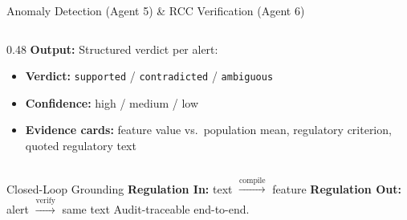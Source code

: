 \documentclass[10pt, aspectratio=169]{beamer}
\newcommand{\hlg}[1]{\textcolor{accentgreen}{#1}}
\newcommand{\hlo}[1]{\textcolor{accentorange}{#1}}
\newcommand{\hlr}[1]{\textcolor{accentred}{#1}}
\begin{document}
\begin{frame}{Anomaly Detection (Agent 5) \& RCC Verification (Agent 6)}
\begin{columns}[T]
\begin{column}{0.48\textwidth}
  \textbf{Output:} Structured verdict per alert:
  \begin{itemize}\itemsep0.2em
    \item \textbf{Verdict:} \hlg{\texttt{supported}} / \hlr{\texttt{contradicted}} / \hlo{\texttt{ambiguous}}
    \item \textbf{Confidence:} high / medium / low
    \item \textbf{Evidence cards:} feature value vs.\ population mean, regulatory criterion, quoted regulatory text
  \end{itemize}

  \vspace{0.3em}
\end{column}
\end{columns}

\vspace{0.2em}
\begin{block}{Closed-Loop Grounding}
  \scriptsize
  \textbf{Regulation In:} text \(\xrightarrow{\text{compile}}\) feature \hfill
  \textbf{Regulation Out:} alert \(\xrightarrow{\text{verify}}\) same text \hfill
  Audit-traceable end-to-end.
\end{block}
\end{frame}
\end{document}
